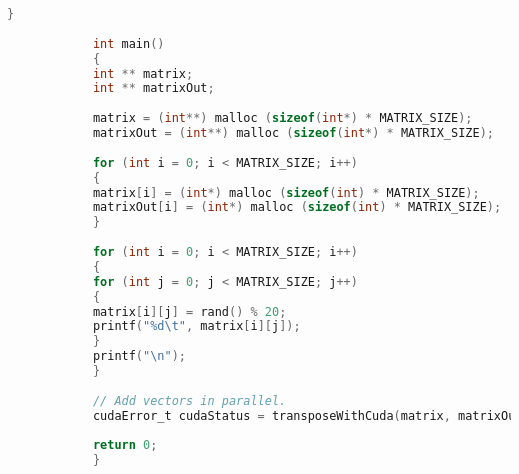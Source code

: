 \begin{lstlisting}[language=C]
			}
			
			int main()
			{
			int ** matrix;
			int ** matrixOut;
			
			matrix = (int**) malloc (sizeof(int*) * MATRIX_SIZE);
			matrixOut = (int**) malloc (sizeof(int*) * MATRIX_SIZE);
			
			for (int i = 0; i < MATRIX_SIZE; i++)
			{
			matrix[i] = (int*) malloc (sizeof(int) * MATRIX_SIZE);
			matrixOut[i] = (int*) malloc (sizeof(int) * MATRIX_SIZE);
			}
			
			for (int i = 0; i < MATRIX_SIZE; i++)
			{
			for (int j = 0; j < MATRIX_SIZE; j++)
			{
			matrix[i][j] = rand() % 20;
			printf("%d\t", matrix[i][j]);
			}
			printf("\n");
			}
			
			// Add vectors in parallel.
			cudaError_t cudaStatus = transposeWithCuda(matrix, matrixOut);
			
			return 0;
			}
			
			\end{lstlisting}
		\newpage